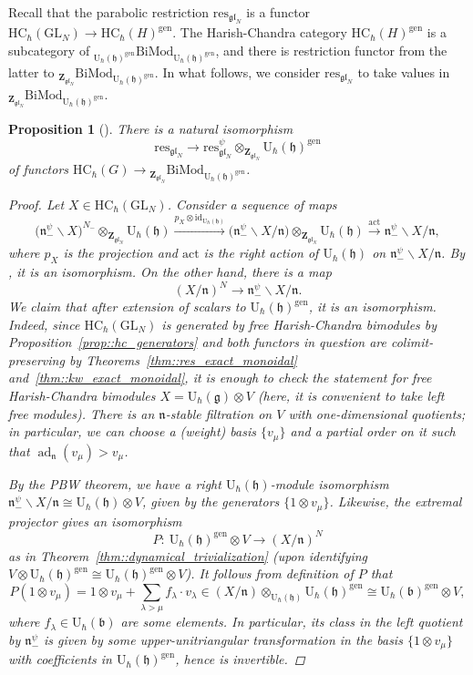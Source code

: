 \documentclass[10pt,a4paper]{article}
\numberwithin{equation}{section}
\newtheorem{Proposition}[Theorem]{Proposition}
{ \theoremstyle{definition}
	\newtheorem{Definition}[Theorem]{Definition}
	\newtheorem{Note}[Theorem]{Note}
	\newtheorem{Example}[Theorem]{Example}
	\newtheorem{Remark}[Theorem]{Remark} }
\newcommand{\U}{\mathrm{U}_{\hbar}}
\newcommand{\Z}{\mathbf{Z}}
\newcommand{\GL}{\mathrm{GL}}
\renewcommand{\b}{\mathfrak{b}}
\newcommand{\g}{\mathfrak{g}}
\newcommand{\h}{\mathfrak{h}}
\newcommand{\n}{\mathfrak{n}}
\newcommand{\act}{\mathrm{act}}
\DeclareMathOperator{\ad}{ad}
\newcommand{\BiMod}[2]{{}_{#1}\mathrm{BiMod}_{#2}}
\newcommand{\gen}{\mathrm{gen}}
\newcommand{\HC}{\mathrm{HC}_{\hbar}}
\newcommand{\id}{\mathrm{id}}
\newcommand{\res}{\mathrm{res}}
\newcommand{\gl}{\mathfrak{gl}}
\begin{document}
	Recall that the parabolic restriction $\res_{\gl_N}$ is a functor $\HC(\GL_N) \rightarrow \HC(H)^{\gen}$. The Harish-Chandra category $\HC(H)^{\gen}$ is a subcategory of $\BiMod{\U(\h)^{\gen}}{\U(\h)^{\gen}}$, and there is restriction functor from the latter to $\BiMod{\Z_{\gl_N}}{\U(\h)^{\gen}}$. In what follows, we consider $\res_{\gl_N}$ to take values in $\BiMod{\Z_{\gl_N}}{\U(\h)^{\gen}}$.
	\begin{Proposition}[{\cite[Corollary 2.7.7]{Kalmykov}}]
		\label{prop::two_res_iso}
		There is a natural isomorphism
		\[
		\res_{\gl_N} \rightarrow \res_{\gl_N}^{\psi} \otimes_{\Z_{\gl_N}} \U(\h)^{\gen}
		\]
		of functors $\HC(G) \rightarrow \BiMod{\Z_{\gl_N}}{\U(\h)^{\gen}}$.
		\begin{proof}
			Let $X\in \HC(\GL_N)$. Consider a sequence of maps
			\begin{equation}
				\label{eq::two_res_comp}
				\bigl(\n_-^{\psi} \backslash X\bigr)^{N_-} \otimes_{\Z_{\gl_N}} \U(\h) \xrightarrow{p_X \otimes \id_{\U(\h)}} \bigl(\n_-^{\psi} \backslash X / \n\bigr) \otimes_{\Z_{\gl_N}} \U(\h) \xrightarrow{\act} \n_-^{\psi} \backslash X / \n,
			\end{equation}
			where $p_X$ is the projection and $\act$ is the right action of $\U(\h)$ on $\n_-^{\psi} \backslash X / \n$. By \cite[Lemma~6.2.1]{GinzburgKazhdan}, it is an isomorphism. On the other hand, there is a map
			\begin{equation}
				\label{eq::two_res_invert}
				(X/\n)^{N} \rightarrow \n_-^{\psi} \backslash X / \n.
			\end{equation}
			We claim that after extension of scalars to $\U(\h)^{\gen}$, it is an isomorphism. Indeed, since $\HC(\GL_N)$ is generated by free Harish-Chandra bimodules by Proposition~\ref{prop::hc_generators} and both functors in question are colimit-preserving by Theorems~\ref{thm::res_exact_monoidal} and~\ref{thm::kw_exact_monoidal}, it is enough to check the statement for free Harish-Chandra bimodules $X = \U(\g) \otimes V$ (here, it is convenient to take \emph{left} free modules). There is an $\n$-stable filtration on $V$ with one-dimensional quotients; in particular, we can choose a (weight) basis $\{v_{\mu}\}$ and a partial order on it such that $\ad_{\n}(v_{\mu}) > v_{\mu}$.
			
			By the PBW theorem, we have a right $\U(\h)$-module isomorphism
$
			\n_-^{\psi} \backslash X /\n \cong \U(\h) \otimes V$,
			given by the generators $\{ 1\otimes v_{\mu}\}$. Likewise, the extremal projector gives an isomorphism
			\[
			P\colon\ \U(\h)^{\gen} \otimes V \rightarrow (X/\n)^{N}
			\]
			as in Theorem~\ref{thm::dynamical_trivialization} (upon identifying $V \otimes \U(\h)^{\gen} \cong \U(\h)^{\gen} \otimes V$). It follows from definition of $P$ that
			\[
			P(1\otimes v_{\mu}) = 1\otimes v_{\mu} + \sum_{\lambda > \mu} f_{\lambda} \cdot v_{\lambda} \in (X/\n) \otimes_{\U(\h)} \U(\h)^{\gen} \cong \U(\b)^{\gen} \otimes V,
			\]
			where $f_{\lambda} \in \U(\b)$ are some elements. In particular, its class in the left quotient by $\n_-^{\psi}$ is given by some upper-unitriangular transformation in the basis $\{1\otimes v_{\mu}\}$ with coefficients in $\U(\h)^{\gen}$, hence is invertible.
			

\end{proof}
\end{Proposition}
\end{document}
